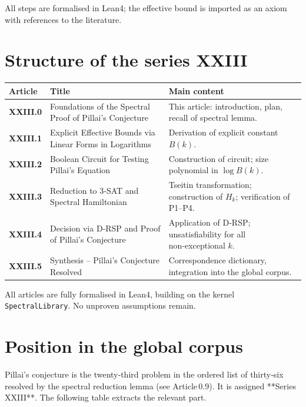 \documentclass[11pt,a4paper]{article}
\begin{document}
All steps are formalised in Lean4; the effective bound is imported as an axiom with references to the literature.

\section{Structure of the series XXIII}

\begin{center}
\small
\begin{tabular}{@{}>{\bfseries}l>{\raggedright\arraybackslash}p{4.5cm}>{\raggedright\arraybackslash}p{6cm}@{}}
\toprule
\textbf{Article} & \textbf{Title} & \textbf{Main content} \\
\midrule
XXIII.0 & Foundations of the Spectral Proof of Pillai's Conjecture & This article: introduction, plan, recall of spectral lemma. \\
XXIII.1 & Explicit Effective Bounds via Linear Forms in Logarithms & Derivation of explicit constant $B(k)$. \\
XXIII.2 & Boolean Circuit for Testing Pillai's Equation & Construction of circuit; size polynomial in $\log B(k)$. \\
XXIII.3 & Reduction to 3‑SAT and Spectral Hamiltonian & Tseitin transformation; construction of $H_k$; verification of P1–P4. \\
XXIII.4 & Decision via D‑RSP and Proof of Pillai's Conjecture & Application of D‑RSP; unsatisfiability for all non‑exceptional $k$. \\
XXIII.5 & Synthesis – Pillai's Conjecture Resolved & Correspondence dictionary, integration into the global corpus. \\
\bottomrule
\end{tabular}
\end{center}

All articles are fully formalised in Lean4, building on the kernel \texttt{SpectralLibrary}. No unproven assumptions remain.

\section{Position in the global corpus}

Pillai's conjecture is the twenty‑third problem in the ordered list of thirty‑six resolved by the spectral reduction lemma (see Article 0.9). It is assigned **Series XXIII**. The following table extracts the relevant part.
\end{document}
